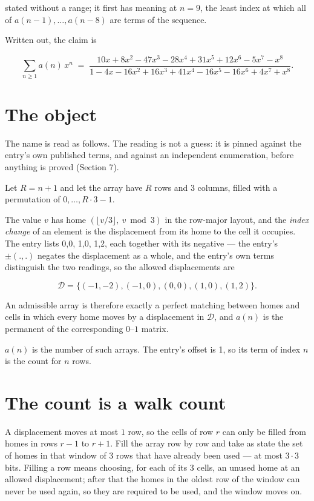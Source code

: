 \documentclass[11pt]{article}
\theoremstyle{definition}
\begin{document}
stated without a range; it first has meaning at $n = 9$, the least index at which all of $a(n-1),\dots,a(n-8)$ are terms of the sequence.

Written out, the claim is

\[\sum_{n \ge 1} a(n)\,x^n \;=\; \frac{10x + 8x^{2} - 47x^{3} - 28x^{4} + 31x^{5} + 12x^{6} - 5x^{7} - x^{8}}{1 - 4x - 16x^{2} + 16x^{3} + 41x^{4} - 16x^{5} - 16x^{6} + 4x^{7} + x^{8}}.\]

\section{The object}

The name is read as follows. The reading is not a guess: it is pinned against the entry's own published terms, and against an independent enumeration, before anything is proved (Section 7).

Let $R = n + 1$ and let the array have $R$ rows and $3$ columns, filled with a permutation of $0,\dots,R\cdot3-1$.

The value $v$ has home $(\lfloor v/3\rfloor,\ v \bmod 3)$ in the row-major layout, and the {\itshape index change} of an element is the displacement from its home to the cell it occupies. The entry lists 0,0, 1,0, 1,2, each together with its negative --- the entry's $\pm(.,.)$ negates the displacement as a whole, and the entry's own terms distinguish the two readings, so the allowed displacements are

\[\mathcal{D} = \{(-1,-2), (-1,0), (0,0), (1,0), (1,2)\}.\]

An admissible array is therefore exactly a perfect matching between homes and cells in which every home moves by a displacement in $\mathcal{D}$, and $a(n)$ is the permanent of the corresponding $0$--$1$ matrix.

$a(n)$ is the number of such arrays. The entry's offset is 1, so its term of index $n$ is the count for $n$ rows.

\section{The count is a walk count}

A displacement moves at most $1$ row, so the cells of row $r$ can only be filled from homes in rows $r-1$ to $r+1$. Fill the array row by row and take as state the set of homes in that window of $3$ rows that have already been used --- at most $3\cdot3$ bits. Filling a row means choosing, for each of its $3$ cells, an unused home at an allowed displacement; after that the homes in the oldest row of the window can never be used again, so they are required to be used, and the window moves on.
\end{document}
